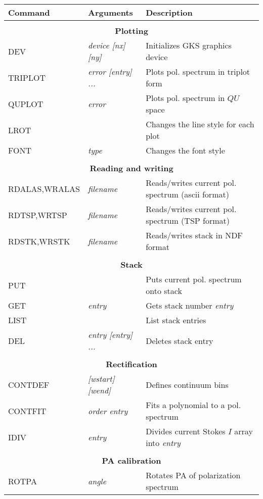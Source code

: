 \begin{center}
\begin{tabular}{lll}
\hline \hline
Command & Arguments & Description \\ \hline \hline \\
\multicolumn{3}{c}{\bf Plotting} \\ \hline 
DEV     & {\it device [nx] [ny]} & Initializes GKS graphics device \\
TRIPLOT     & {\it error [entry] ... }& Plots pol. spectrum in triplot form \\
QUPLOT      & {\it error}        & Plots pol. spectrum in $QU$ space \\
LROT        &                    & Changes the line style for each plot \\
FONT        & {\it type}         & Changes the font style \\
\\
\multicolumn{3}{c}{\bf Reading and writing} \\ \hline
RDALAS,WRALAS & {\it filename}   & Reads/writes current pol. spectrum (ascii format) \\
RDTSP,WRTSP & {\it filename}     & Reads/writes current pol. spectrum (TSP format) \\
RDSTK,WRSTK & {\it filename}     & Reads/writes stack in NDF format \\
\\ 
\multicolumn{3}{c}{\bf Stack} \\ \hline
PUT         &                    & Puts current pol. spectrum onto stack\\
GET         &     {\it entry}    & Gets stack number {\it entry} \\
LIST        &                    & List stack entries            \\
DEL         & {\it entry [entry] ...}  & Deletes stack entry           \\
\\ 
\multicolumn{3}{c}{\bf Rectification} \\ \hline
CONTDEF     & {\it [wstart] [wend]} & Defines continuum bins  \\
CONTFIT     & {\it order entry}   & Fits a polynomial to a pol. spectrum \\
IDIV        & {\it entry}         & Divides current Stokes $I$ array into {\it entry} \\
\\ 
\multicolumn{3}{c}{\bf PA calibration} \\ \hline
ROTPA       & {\it angle}         & Rotates PA of polarization spectrum \\

\end{tabular}
\end{center}
